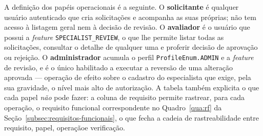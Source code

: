 A definição dos papéis operacionais é a seguinte. O \textbf{solicitante} é qualquer
usuário autenticado que cria solicitações e acompanha as suas próprias; não tem acesso à
listagem geral nem à decisão de revisão. O \textbf{avaliador} é o usuário que possui a
\textit{feature} \texttt{SPECIALIST\_REVIEW}, o que lhe permite listar todas as
solicitações, consultar o detalhe de qualquer uma e proferir decisão de aprovação ou
rejeição. O \textbf{administrador} acumula o perfil \texttt{ProfileEnum.ADMIN} e a
\textit{feature} de revisão, e é o único habilitado a executar a reversão de uma
alteração aprovada — operação de efeito sobre o cadastro do especialista que exige, pela
sua gravidade, o nível mais alto de autorização. A tabela também explicita o que cada
papel \textit{não} pode fazer: a coluna de requisito permite rastrear, para cada
operação, o requisito funcional correspondente no
Quadro~\ref{qua:rf} da Seção~\ref{subsec:requisitos-funcionais}, o
que fecha a cadeia de rastreabilidade entre requisito, papel, operaçãoe verificação.
